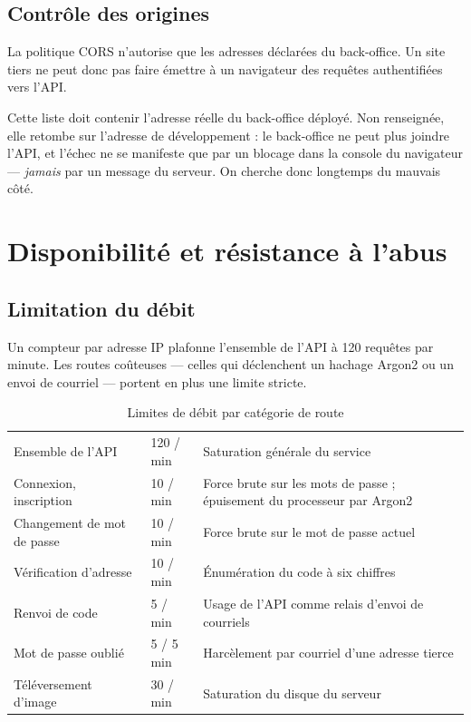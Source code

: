 \subsection{Contrôle des origines}

La politique CORS n'autorise que les adresses déclarées du back-office. Un site
tiers ne peut donc pas faire émettre à un navigateur des requêtes authentifiées
vers l'API.

\begin{attention}
Cette liste doit contenir l'adresse réelle du back-office déployé. Non
renseignée, elle retombe sur l'adresse de développement : le back-office ne
peut plus joindre l'API, et l'échec ne se manifeste que par un blocage dans la
console du navigateur --- \emph{jamais} par un message du serveur. On cherche
donc longtemps du mauvais côté.
\end{attention}

\section{Disponibilité et résistance à l'abus}

\subsection{Limitation du débit}

Un compteur par adresse IP plafonne l'ensemble de l'API à 120 requêtes par
minute. Les routes coûteuses --- celles qui déclenchent un hachage Argon2 ou un
envoi de courriel --- portent en plus une limite stricte.

\begin{table}[H]
\centering
\caption{Limites de débit par catégorie de route}
\label{tab:rate-limit}
\begin{tabularx}{\textwidth}{L{5.4cm} C{3.0cm} X}
\toprule
{} &  &  \\
\midrule
Ensemble de l'API & 120 / min &
Saturation générale du service \\
Connexion, inscription & 10 / min &
Force brute sur les mots de passe ; épuisement du processeur par Argon2 \\
Changement de mot de passe & 10 / min & Force brute sur le mot de passe actuel \\
Vérification d'adresse & 10 / min & Énumération du code à six chiffres \\
Renvoi de code & 5 / min & Usage de l'API comme relais d'envoi de courriels \\
Mot de passe oublié & 5 / 5 min & Harcèlement par courriel d'une adresse tierce \\
Téléversement d'image & 30 / min & Saturation du disque du serveur \\
\bottomrule
\end{tabularx}
\end{table}

